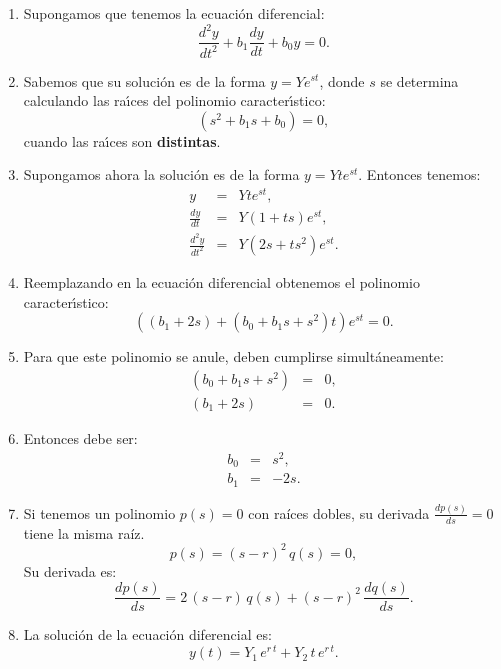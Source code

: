 \begin{enumerate}
	\item Supongamos que tenemos la ecuaci\'{o}n diferencial:
	\begin{equation}
		\frac{d^{2}y}{dt^{2}} + b_{1} \frac{dy}{dt} + b_{0} y = 0. 
	\end{equation}
	
	\item Sabemos que su soluci\'{o}n es de la forma $y = Y e^{s t}$, donde $s$ se determina calculando las ra\'{\i}ces del polinomio caracter\'{\i}stico:
	\begin{equation}
		(s^{2} + b_{1} s + b_{0}) = 0,
	\end{equation}
	cuando las ra\'{\i}ces son \textbf{distintas}.
	
	\item Supongamos ahora la soluci\'{o}n es de la forma $y = Y t e^{s t}$. Entonces tenemos:
	\begin{eqnarray}
		y &=& Y t e^{s t},                                      \\
		\frac{dy}{dt} &=& Y (1 + t s) e^{s t},                   \\  
		\frac{d^{2}y}{dt^{2}} &=& Y (2 s + t s^{2}) e^{s t}.
	\end{eqnarray}
	
	\item Reemplazando en la ecuaci\'{o}n diferencial obtenemos el polinomio caracter\'{\i}stico:
	\begin{equation}
		((b_{1} + 2 s) + (b_{0} + b_{1} s + s^{2}) t) e^{s t} = 0.
	\end{equation}
	
	\item Para que este polinomio se anule, deben cumplirse simult\'{a}neamente:
	\begin{eqnarray}
		(b_{0} + b_{1} s + s^{2}) &=& 0, \\
		(b_{1} + 2 s) &=& 0.
	\end{eqnarray}
	
	\item Entonces debe ser:
	\begin{eqnarray}
		b_{0} &=& s^{2}, \\
		b_{1} &=& -2 s.
	\end{eqnarray}
	
	\item Si tenemos un polinomio $p(s) = 0$ con raíces dobles, su derivada $\frac{dp(s)}{ds} = 0$ tiene la misma raíz.
	\begin{equation}
		p(s) = (s - r)^{2} \, q(s) = 0,
	\end{equation}
	Su derivada es:
	\begin{equation}
		\frac{dp(s)}{ds} = 2 \, (s -r) \, q(s) + (s - r)^{2} \, \frac{dq(s)}{ds}.
	\end{equation}
	
	\item La solución de la ecuación diferencial es:
	\begin{equation}
		y(t) = Y_{1} \, e^{r \, t} + Y_{2} \, t \, e^{r \, t}.
	\end{equation}
\end{enumerate}

